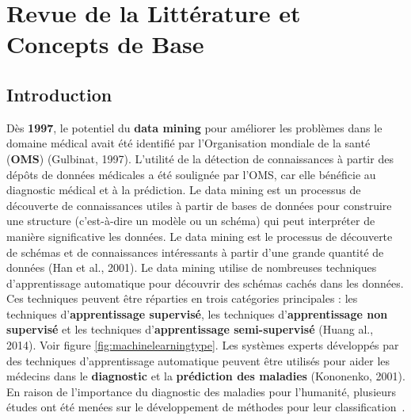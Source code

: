 \chapter{Revue de la Littérature et Concepts de Base}

\section{Introduction}
Dès \textbf{1997}, le potentiel du \textbf{data mining} pour améliorer les problèmes dans le domaine médical avait été identifié par l'Organisation mondiale de la santé (\textbf{OMS}) (Gulbinat, 1997). L'utilité de la détection de connaissances à partir des dépôts de données médicales a été soulignée par l'OMS, car elle bénéficie au diagnostic médical et à la prédiction. Le data mining est un processus de découverte de connaissances utiles à partir de bases de données pour construire une structure (c'est-à-dire un modèle ou un schéma) qui peut interpréter de manière significative les données. Le data mining est le processus de découverte de schémas et de connaissances intéressants à partir d'une grande quantité de données (Han et al., 2001). Le data mining utilise de nombreuses techniques d'apprentissage automatique pour découvrir des schémas cachés dans les données. Ces techniques peuvent être réparties en trois catégories principales : les techniques d'\textbf{apprentissage supervisé}, les techniques d'\textbf{apprentissage non supervisé} et les techniques d'\textbf{apprentissage semi-supervisé} (Huang al., 2014). Voir figure \ref{fig:machinelearningtype}. Les systèmes experts développés par des techniques d'apprentissage automatique peuvent être utilisés pour aider les médecins dans le \textbf{diagnostic} et la \textbf{prédiction des maladies} (Kononenko, 2001). En raison de l'importance du diagnostic des maladies pour l'humanité, plusieurs études ont été menées sur le développement de méthodes pour leur classification~\cite{Analytical2017Meh}.

